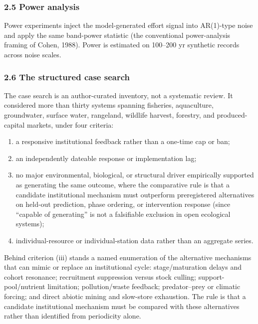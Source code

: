 \documentclass[11pt]{article}
\providecommand{\tightlist}{\setlength{\itemsep}{0pt}\setlength{\parskip}{0pt}}
\begin{document}
\subsubsection{2.5 Power analysis}\label{power-analysis}

Power experiments inject the model-generated effort signal into
AR(1)-type noise and apply the same band-power statistic (the
conventional power-analysis framing of Cohen, 1988). Power is estimated
on 100--200 yr synthetic records across noise scales.

\subsubsection{2.6 The structured case
search}\label{the-structured-case-search}

The case search is an author-curated inventory, not a systematic review.
It considered more than thirty systems spanning fisheries, aquaculture,
groundwater, surface water, rangeland, wildlife harvest, forestry, and
produced-capital markets, under four criteria:

\begin{enumerate}
\def\labelenumi{(\roman{enumi})}
\tightlist
\item
  a responsive institutional feedback rather than a one-time cap or ban;
\item
  an independently dateable response or implementation lag;
\item
  no major environmental, biological, or structural driver empirically
  supported as generating the same outcome, where the comparative rule
  is that a candidate institutional mechanism must outperform
  preregistered alternatives on held-out prediction, phase ordering, or
  intervention response (since ``capable of generating'' is not a
  falsifiable exclusion in open ecological systems);
\item
  individual-resource or individual-station data rather than an
  aggregate series.
\end{enumerate}

Behind criterion (iii) stands a named enumeration of the alternative
mechanisms that can mimic or replace an institutional cycle:
stage/maturation delays and cohort resonance; recruitment suppression
versus stock culling; support-pool/nutrient limitation; pollution/waste
feedback; predator--prey or climatic forcing; and direct abiotic mining
and slow-store exhaustion. The rule is that a candidate institutional
mechanism must be compared with these alternatives rather than
identified from periodicity alone.
\end{document}
